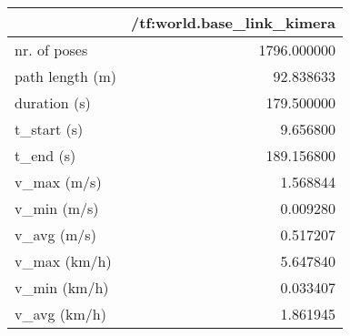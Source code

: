 \begin{tabular}{lr}
\toprule
{} &  /tf:world.base\_link\_kimera \\
\midrule
nr. of poses    &                 1796.000000 \\
path length (m) &                   92.838633 \\
duration (s)    &                  179.500000 \\
t\_start (s)     &                    9.656800 \\
t\_end (s)       &                  189.156800 \\
v\_max (m/s)     &                    1.568844 \\
v\_min (m/s)     &                    0.009280 \\
v\_avg (m/s)     &                    0.517207 \\
v\_max (km/h)    &                    5.647840 \\
v\_min (km/h)    &                    0.033407 \\
v\_avg (km/h)    &                    1.861945 \\
\bottomrule
\end{tabular}
